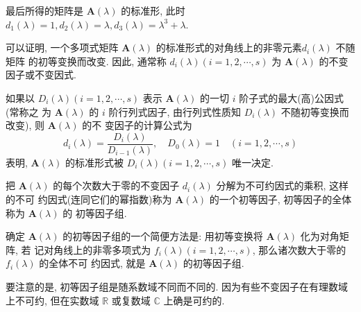 最后所得的矩阵是 $\bm{A}(\lambda)$ 的标准形, 此时 $d_1(\lambda) = 1, d_2(\lambda) = \lambda, d_3(\lambda) = \lambda^3 + \lambda$.

\par 可以证明, 一个多项式矩阵 $\bm{A}(\lambda)$ 的标准形式的对角线上的非零元素$d_i(\lambda)$ 不随矩阵
的初等变换而改变. 因此, 通常称 $d_i(\lambda)(i = 1, 2, \cdots, s)$ 为 $\bm{A}(\lambda)$ 的不变因子或不变因式.

\par 如果以 $D_i(\lambda)(i = 1, 2, \cdots, s)$ 表示 $\bm{A}(\lambda)$ 的一切 $i$ 阶子式的最大(高)公因式(常称之
为 $\bm{A}(\lambda)$ 的 $i$ 阶行列式因子, 由行列式性质知 $D_i(\lambda)$ 不随初等变换而改变), 则 $\bm{A}(\lambda)$ 的不
变因子的计算公式为
$$
    d_i(\lambda) = \dfrac{D_i(\lambda)}{D_{i-1}(\lambda)}, \quad D_0(\lambda) = 1 \quad (i = 1, 2, \cdots, s)
$$
表明, $\bm{A}(\lambda)$ 的标准形式被 $D_i(\lambda) (i = 1, 2, \cdots, s)$ 唯一决定.

\par 把 $\bm{A}(\lambda)$ 的每个次数大于零的不变因子 $d_i(\lambda)$ 分解为不可约因式的乘积, 这样的不可
约因式(连同它们的幂指数)称为 $\bm{A}(\lambda)$ 的一个初等因子, 初等因子的全体称为 $\bm{A}(\lambda)$ 的
初等因子组.

\par 确定 $\bm{A}(\lambda)$ 的初等因子组的一个简便方法是: 用初等变换将 $\bm{A}(\lambda)$ 化为对角矩阵, 若
记对角线上的非零多项式为 $f_i(\lambda)(i = 1,2,\cdots,s)$, 那么诸次数大于零的 $f_i(\lambda)$ 的全体不可
约因式, 就是 $\bm{A}(\lambda)$ 的初等因子组.

\par 要注意的是, 初等因子组是随系数域不同而不同的. 因为有些不变因子在有理数域
上不可约, 但在实数域 $\mathbb{R}$ 或复数域 $\mathbb{C}$ 上确是可约的.

